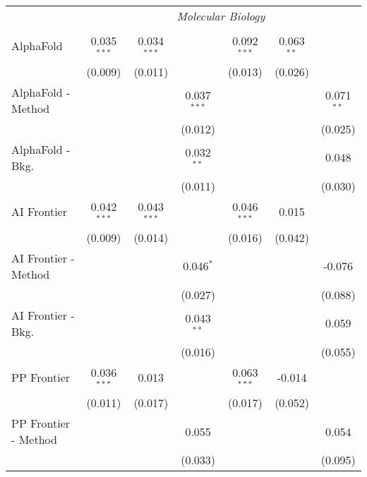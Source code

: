 \begin{tabular}{lcccccc}
 & \multicolumn{6}{c}{\textit{Molecular Biology}} \\ \\
   AlphaFold            & 0.035$^{***}$ & 0.034$^{***}$ &               & 0.092$^{***}$ & 0.063$^{**}$ &   \\   
                        & (0.009)       & (0.011)       &               & (0.013)       & (0.026)      &   \\   
   AlphaFold - Method   &               &               & 0.037$^{***}$ &               &              & 0.071$^{**}$\\   
                        &               &               & (0.012)       &               &              & (0.025)\\   
   AlphaFold - Bkg.     &               &               & 0.032$^{**}$  &               &              & 0.048\\   
                        &               &               & (0.011)       &               &              & (0.030)\\   
   AI Frontier          & 0.042$^{***}$ & 0.043$^{***}$ &               & 0.046$^{***}$ & 0.015        &   \\   
                        & (0.009)       & (0.014)       &               & (0.016)       & (0.042)      &   \\   
   AI Frontier - Method &               &               & 0.046$^{*}$   &               &              & -0.076\\   
                        &               &               & (0.027)       &               &              & (0.088)\\   
   AI Frontier - Bkg.   &               &               & 0.043$^{**}$  &               &              & 0.059\\   
                        &               &               & (0.016)       &               &              & (0.055)\\   
   PP Frontier          & 0.036$^{***}$ & 0.013         &               & 0.063$^{***}$ & -0.014       &   \\   
                        & (0.011)       & (0.017)       &               & (0.017)       & (0.052)      &   \\   
   PP Frontier - Method &               &               & 0.055         &               &              & 0.054\\   
                        &               &               & (0.033)       &               &              & (0.095)\\   

\end{tabular}
